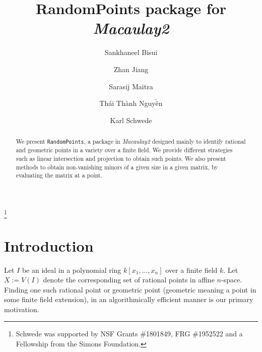 \documentclass[11pt]{amsart}
\theoremstyle{definition}
\begin{document}
\title{{RandomPoints} package for \emph{Macaulay2}}
\author{Sankhaneel Bisui}
\address{Department of Mathematics, Tulane University, New Orleans, LA 70118}
\author{Zhan Jiang}
\address{Department of Mathematics, University of Michigan, Ann Arbor, MI 48109}
\author{Sarasij Maitra}
\address{Department of Mathematics, University of Virginia, Charlottesville, VA 22904}
\author{Th\'ai Th\`anh Nguy$\tilde{\text{\^e}}$n}
\address{Department of Mathematics, Tulane University, New Orleans, LA 70118}
\author{Karl Schwede}
\address{Department of Mathematics, University of Utah, 155 S 1400 E Room 233, Salt Lake City, UT, 84112}

\thanks{Schwede was supported by NSF Grants \#1801849, FRG \#1952522 and a Fellowship from the Simons Foundation.}

\begin{abstract}
  We present {\tt RandomPoints}, a package in \emph{Macaulay2} designed mainly to identify rational and geometric points in a variety over a finite field. We provide different strategies such as linear intersection and projection to obtain such points. We also present methods to obtain non-vanishing minors of a given size in a given matrix, by evaluating the matrix at a point.  %
\end{abstract}



\maketitle

\section{Introduction}
    Let $I$ be an ideal in a polynomial ring $k[x_1,\dots, x_n]$ over a finite field $k$. Let $X:=V(I)$ denote the corresponding set of rational points in affine $n$-space. Finding one such rational point or geometric point (geometric meaning a point in some finite field extension), in an algorithmically efficient manner is our primary motivation. 
\end{document}
